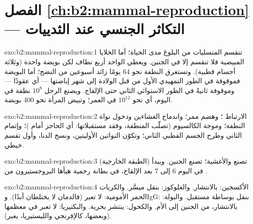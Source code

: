 \section*{الفصل \ref{ch:b2:mammal-reproduction} --- التكاثر الجنسي عند الثدييات}

\begin{solution}{exo:b2:mammal-reproduction:1}
تنقسم المنسليات من البلوغ مدى الحياة؛ أما الخلايا المبيضية فلا
تنقسم إلا في الجنين. ويعطي  الواحد أربع نطاف لكن
بويضة واحدة (وثلاثة أجسام قطبية). وتستغرق النطفة نحو 64 يومًا زائد
أسبوعين من النضج؛ أما البويضة فموقوفة في الطور التمهيدي الأول من
قبل الولادة إلى شهر إباضتها --- أي عقودًا --- وموقوفة ثانيةً في
الطور الاستوائي الثاني حتى الإلقاح. ويصنع الرجل $10^{8}$ نطفة في
اليوم، أي نحو $10^{12}$ في العمر؛ وتبيض المرأة نحو 400 بويضة.
\end{solution}

\begin{solution}{exo:b2:mammal-reproduction:2}
الارتباط ؛  وهضم
ممر؛ واندماج الغشاءين ودخول نواة النطفة؛
وموجة الكالسيوم  (تصلّب المنطقة، وفقد
مستقبلاتها: أي الحاجز أمام )؛ وإتمام 
الثاني وطرح الجسم القطبي الثاني؛ وتكوّن النواتين
الأوليتين، ونسخ الدنا، وأول تقسم خيطي.
\end{solution}

\begin{solution}{exo:b2:mammal-reproduction:3}
 (الطبقة الخارجية) تصنع  والأغشية؛  تصنع الجنين. ويبدأ  في اليوم 6 إلى 7
بعد الإلقاح، في بطانة رحمية هيأها البروجستيرون
من .
\end{solution}

\begin{solution}{exo:b2:mammal-reproduction:4}
الأكسجين: بالانتشار. والغلوكوز: بنقل ميسَّر. والكريات الحمر
الأمومية: لا تعبر (فالدمان لا يختلطان أبدًا). وIgG: بنقل
بوساطة مستقبل. والبولة: بالانتشار، من الجنين إلى الأم. والكحول:
ينتشر بحرية. والبكتيريا: لا تعبر في معظمها (وبعضها، كالإفرنجي
والليستيريا، يعبر).
\end{solution}

